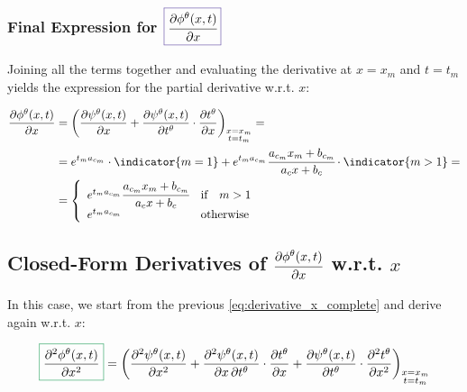 \subsubsection{Final Expression for $\color{Violet}\boxed{\color{black}\cfrac{\partial \phi^\theta(x,t)}{\partial x}}$}

Joining all the terms together and evaluating the derivative at $x = x_m$ and $t = t_m$ yields the expression for the partial derivative w.r.t. $x$:

\begin{equation}\label{eq:derivative_x_complete}
\begin{aligned}
  \frac{\partial \phi^\theta(x,t)}{\partial x} &= 
  \bigg(
  \frac{\partial \psi^\theta(x,t)}{\partial x} + 
  \frac{\partial \psi^\theta(x,t)}{\partial t^\theta} \cdot
  \frac{\partial t^\theta}{\partial x}
  \bigg)_{\substack{x = x_m \\ t = t_m}} = \\ &= 
  e^{t_m a_{c_m}} \cdot \indicator{m=1}  + e^{t_m a_{c_m}} \cfrac{a_{c_m} x_m + b_{c_m}}{a_c x + b_c}  \cdot \indicator{m>1} = \\ &=
  \left\{\begin{array}{ll}
    e^{t_m a_{c_m}} \cfrac{a_{c_m} x_m + b_{c_m}}{a_c x + b_c} & \text{if} \quad m>1\\ 
    e^{t_m a_{c_m}} & \text{otherwise}
    \end{array}\right.
\end{aligned}
\end{equation}


\subsection{Closed-Form Derivatives of $\cfrac{\partial \phi^\theta(x,t)}{\partial x}$ w.r.t. $x$}\label{sec:closed_form_derivative_x_x}


In this case, we start from the previous \cref{eq:derivative_x_complete} and derive again w.r.t. $x$:

\begin{equation}
  \color{ForestGreen}\boxed{\color{black}\frac{\partial^2 \phi^\theta(x,t)}{\partial x^2}}\color{black} = 
  \bigg(
  \frac{\partial^2 \psi^\theta(x,t)}{\partial x^2} + 
  \frac{\partial^2 \psi^\theta(x,t)}{\partial x \, \partial t^\theta} \cdot
  \frac{\partial t^\theta}{\partial x} + 
  \frac{\partial \psi^\theta(x,t)}{\partial t^\theta} \cdot
  \frac{\partial^2 t^\theta}{\partial x^2}
  \bigg)_{\substack{x = x_m \\ t = t_m}}
\end{equation}

